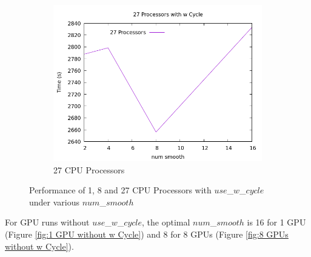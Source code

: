 \documentclass{article}
\begin{document}
\begin{figure}[H]
    \begin{subfigure}{0.48\textwidth}
        \includegraphics[width=\textwidth]{27 Proc with w Cycle.png}
        \caption{27 CPU Processors}
        \label{fig:27 Procs with w Cycle}
    \end{subfigure}
    
    \caption{Performance of 1, 8 and 27 CPU Processors with $use$\_$w$\_$cycle$ under various $num$\_$smooth$}
\end{figure}

For GPU runs without $use$\_$w$\_$cycle$, the optimal $num$\_$smooth$ is 16 for 1 GPU (Figure \ref{fig:1 GPU without w Cycle}) and 8 for 8 GPUs (Figure \ref{fig:8 GPUs without w Cycle}).
\end{document}

